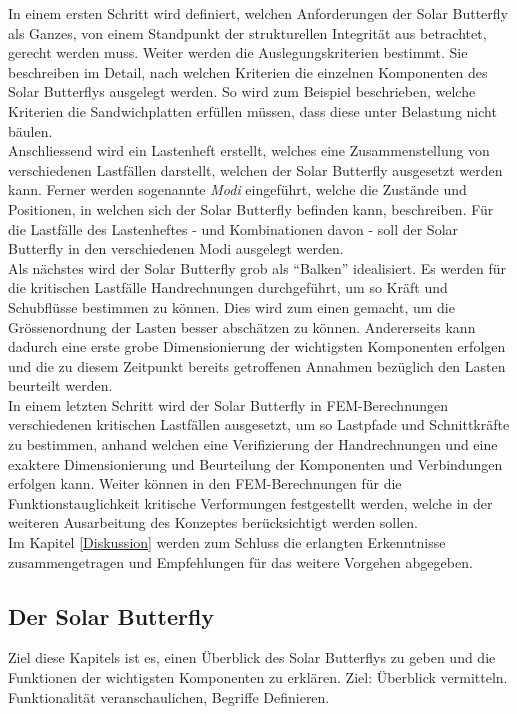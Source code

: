 In einem ersten Schritt wird definiert, welchen Anforderungen der Solar Butterfly als Ganzes, von einem Standpunkt der strukturellen Integrität aus betrachtet, gerecht werden muss. Weiter werden die Auslegungskriterien bestimmt. Sie beschreiben im Detail, nach welchen Kriterien die einzelnen Komponenten des Solar Butterflys ausgelegt werden. So wird zum Beispiel beschrieben, welche Kriterien die Sandwichplatten erfüllen müssen, dass diese unter Belastung nicht bäulen.\\
Anschliessend wird ein Lastenheft erstellt, welches eine Zusammenstellung von verschiedenen Lastfällen darstellt, welchen der Solar Butterfly ausgesetzt werden kann. Ferner werden sogenannte \emph{Modi} eingeführt, welche die Zustände und Positionen, in welchen sich der Solar Butterfly befinden kann, beschreiben. Für die Lastfälle des Lastenheftes - und Kombinationen davon - soll der Solar Butterfly in den verschiedenen Modi ausgelegt werden.\\
Als nächstes wird der Solar Butterfly grob als ``Balken'' idealisiert. Es werden für die kritischen Lastfälle Handrechnungen durchgeführt, um so Kräft und Schubflüsse bestimmen zu können. Dies wird zum einen gemacht, um die Grössenordnung der Lasten besser abschätzen zu können. Andererseits kann dadurch eine erste grobe Dimensionierung der wichtigsten Komponenten erfolgen und die zu diesem Zeitpunkt bereits getroffenen Annahmen bezüglich den Lasten beurteilt werden.\\
In einem letzten Schritt wird der Solar Butterfly in FEM-Berechnungen verschiedenen kritischen Lastfällen ausgesetzt, um so Lastpfade und Schnittkräfte zu bestimmen, anhand welchen eine Verifizierung der Handrechnungen und eine exaktere Dimensionierung und Beurteilung der Komponenten und Verbindungen erfolgen kann. Weiter können in den FEM-Berechnungen für die Funktionstauglichkeit kritische Verformungen festgestellt werden, welche in der weiteren Ausarbeitung des Konzeptes berücksichtigt werden sollen.\\
Im Kapitel \ref{Diskussion} werden zum Schluss die erlangten Erkenntnisse zusammengetragen und Empfehlungen für das weitere Vorgehen abgegeben.

\subsection{Der Solar Butterfly}
Ziel diese Kapitels ist es, einen Überblick des Solar Butterflys zu geben und die Funktionen der wichtigsten Komponenten zu erklären.
Ziel: Überblick vermitteln. Funktionalität veranschaulichen, Begriffe Definieren.

